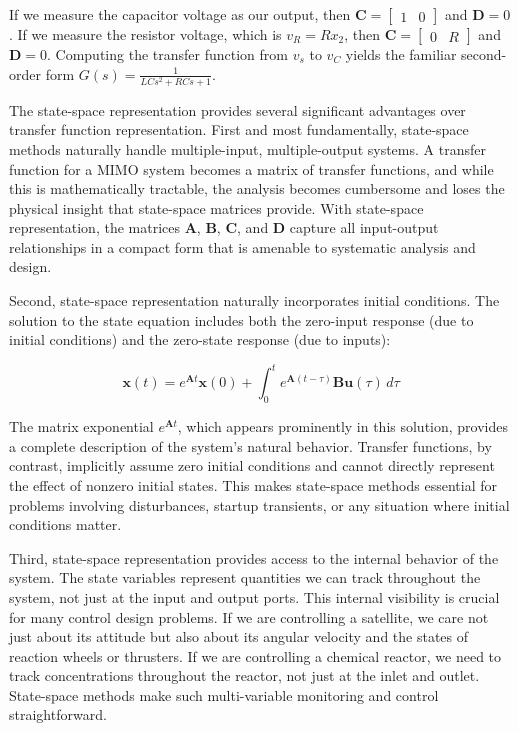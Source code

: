 If we measure the capacitor voltage as our output, then $\mathbf{C} = \begin{bmatrix} 1 & 0 \end{bmatrix}$ and $\mathbf{D} = 0$. If we measure the resistor voltage, which is $v_R = Rx_2$, then $\mathbf{C} = \begin{bmatrix} 0 & R \end{bmatrix}$ and $\mathbf{D} = 0$. Computing the transfer function from $v_s$ to $v_C$ yields the familiar second-order form $G(s) = \frac{1}{LCs^2 + RCs + 1}$.

The state-space representation provides several significant advantages over transfer function representation. First and most fundamentally, state-space methods naturally handle multiple-input, multiple-output systems. A transfer function for a MIMO system becomes a matrix of transfer functions, and while this is mathematically tractable, the analysis becomes cumbersome and loses the physical insight that state-space matrices provide. With state-space representation, the matrices $\mathbf{A}$, $\mathbf{B}$, $\mathbf{C}$, and $\mathbf{D}$ capture all input-output relationships in a compact form that is amenable to systematic analysis and design.

Second, state-space representation naturally incorporates initial conditions. The solution to the state equation includes both the zero-input response (due to initial conditions) and the zero-state response (due to inputs):

\begin{equation}
\mathbf{x}(t) = e^{\mathbf{A}t}\mathbf{x}(0) + \int_0^t e^{\mathbf{A}(t-\tau)}\mathbf{B}\mathbf{u}(\tau)\,d\tau
\end{equation}

The matrix exponential $e^{\mathbf{A}t}$, which appears prominently in this solution, provides a complete description of the system's natural behavior. Transfer functions, by contrast, implicitly assume zero initial conditions and cannot directly represent the effect of nonzero initial states. This makes state-space methods essential for problems involving disturbances, startup transients, or any situation where initial conditions matter.

Third, state-space representation provides access to the internal behavior of the system. The state variables represent quantities we can track throughout the system, not just at the input and output ports. This internal visibility is crucial for many control design problems. If we are controlling a satellite, we care not just about its attitude but also about its angular velocity and the states of reaction wheels or thrusters. If we are controlling a chemical reactor, we need to track concentrations throughout the reactor, not just at the inlet and outlet. State-space methods make such multi-variable monitoring and control straightforward.

